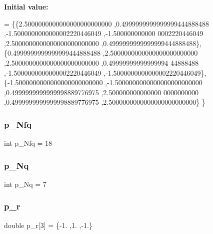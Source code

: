 {\bfseries Initial value\+:}
\begin{DoxyCode}
= \{\{2.5000000000000000000000000 ,0.4999999999999999444888488 ,-1.5000000000000002220446049 ,-1.500000000000
      0002220446049 ,2.5000000000000000000000000 ,0.4999999999999999444888488\},
\{0.4999999999999999444888488 ,2.5000000000000000000000000 ,2.5000000000000000000000000 ,0.49999999999999994
      44888488 ,-1.5000000000000002220446049 ,-1.5000000000000002220446049\},
\{-1.5000000000000000000000000 ,-1.5000000000000000000000000 ,0.4999999999999998889776975 ,2.500000000000000
      0000000000 ,0.4999999999999998889776975 ,2.5000000000000000000000000\}
\}
\end{DoxyCode}
\mbox{\label{a00987_aa030b0a9fe619a48647119bacea600e0}} 
\subsubsection{\texorpdfstring{p\+\_\+\+Nfq}{p\_Nfq}}
{\footnotesize\ttfamily int p\+\_\+\+Nfq = 18}

\mbox{\label{a00987_a207fd9268dfef5bf1505928a4f4c774a}} 
\subsubsection{\texorpdfstring{p\+\_\+\+Nq}{p\_Nq}}
{\footnotesize\ttfamily int p\+\_\+\+Nq = 7}

\mbox{\label{a00987_a7e52da56416e11a4783c0aa859d6b478}} 
\subsubsection{\texorpdfstring{p\+\_\+r}{p\_r}}
{\footnotesize\ttfamily double p\+\_\+r\mbox{[}3\mbox{]} = \{-\/1. ,1. ,-\/1.\}}

